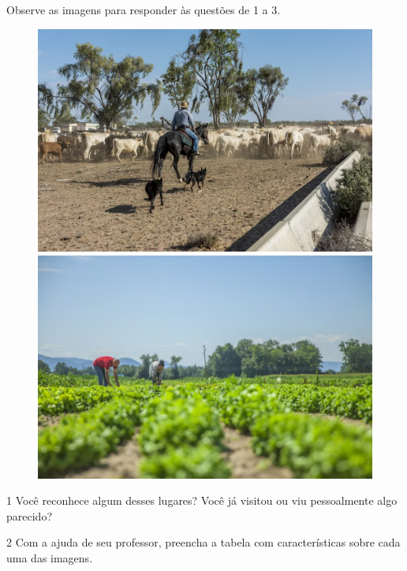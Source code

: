 \pagebreak
{}

Observe as imagens para responder às questões de 1 a 3.

\begin{figure}[htpb!]
\includegraphics[width=.5\textwidth]{./imgs/img55.png}
\includegraphics[width=.5\textwidth]{./imgs/img56.png}
\caption{}
\end{figure}


\num{1} Você reconhece algum desses lugares? Você já visitou ou viu pessoalmente algo parecido?


\num{2} Com a ajuda de seu professor, preencha a tabela com características
sobre cada uma das imagens.\bigskip

